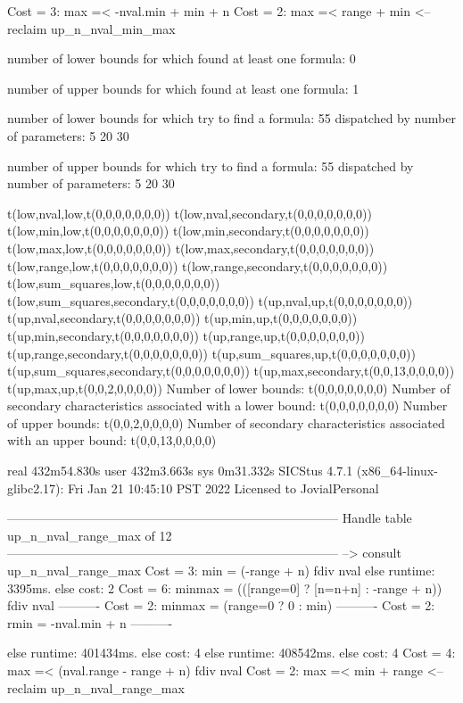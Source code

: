 Cost =  3:  max =< -nval.min + min + n
Cost =  2:  max =< range + min
<-- reclaim up_n_nval_min_max

number of lower bounds for which found at least one formula: 0

number of upper bounds for which found at least one formula: 1

number of lower bounds for which try to find a formula: 55
dispatched by number of parameters: 5  20  30

number of upper bounds for which try to find a formula: 55
dispatched by number of parameters: 5  20  30

t(low,nval,low,t(0,0,0,0,0,0,0))
t(low,nval,secondary,t(0,0,0,0,0,0,0))
t(low,min,low,t(0,0,0,0,0,0,0))
t(low,min,secondary,t(0,0,0,0,0,0,0))
t(low,max,low,t(0,0,0,0,0,0,0))
t(low,max,secondary,t(0,0,0,0,0,0,0))
t(low,range,low,t(0,0,0,0,0,0,0))
t(low,range,secondary,t(0,0,0,0,0,0,0))
t(low,sum_squares,low,t(0,0,0,0,0,0,0))
t(low,sum_squares,secondary,t(0,0,0,0,0,0,0))
t(up,nval,up,t(0,0,0,0,0,0,0))
t(up,nval,secondary,t(0,0,0,0,0,0,0))
t(up,min,up,t(0,0,0,0,0,0,0))
t(up,min,secondary,t(0,0,0,0,0,0,0))
t(up,range,up,t(0,0,0,0,0,0,0))
t(up,range,secondary,t(0,0,0,0,0,0,0))
t(up,sum_squares,up,t(0,0,0,0,0,0,0))
t(up,sum_squares,secondary,t(0,0,0,0,0,0,0))
t(up,max,secondary,t(0,0,13,0,0,0,0))
t(up,max,up,t(0,0,2,0,0,0,0))
Number of lower bounds:                                             t(0,0,0,0,0,0,0)
Number of secondary characteristics associated with a lower bound:  t(0,0,0,0,0,0,0)
Number of upper bounds:                                             t(0,0,2,0,0,0,0)
Number of secondary characteristics associated with an upper bound: t(0,0,13,0,0,0,0)

real	432m54.830s
user	432m3.663s
sys	0m31.332s
SICStus 4.7.1 (x86_64-linux-glibc2.17): Fri Jan 21 10:45:10 PST 2022
Licensed to JovialPersonal


--------------------------------------------------------------------------------
Handle table up_n_nval_range_max of 12
--------------------------------------------------------------------------------
--> consult up_n_nval_range_max
Cost =  3:  min    = (-range + n) fdiv nval %
else runtime: 3395ms. else cost: 2
Cost =  6:  minmax = (([range=0] ? [n=n+n] : -range + n)) fdiv nval %
----------
Cost =  2:  minmax = (range=0 ? 0 : min)
----------
Cost =  2:  rmin   = -nval.min + n
----------

else runtime: 401434ms. else cost: 4
else runtime: 408542ms. else cost: 4
Cost =  4:  max =< (nval.range - range + n) fdiv nval %
Cost =  2:  max =< min + range
<-- reclaim up_n_nval_range_max

